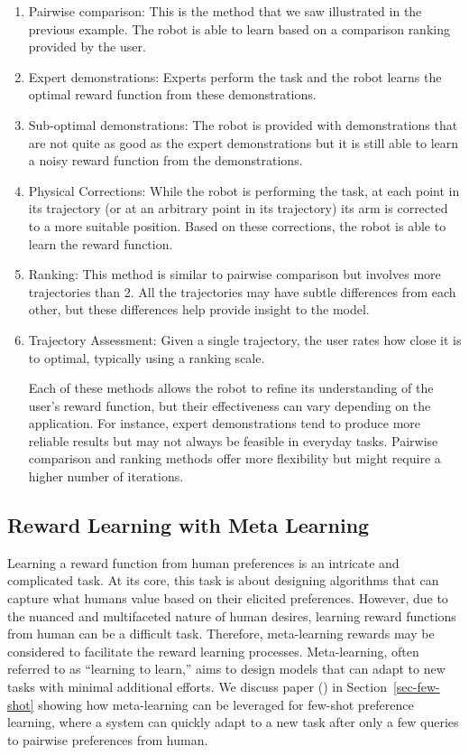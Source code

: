 \documentclass[
  letterpaper,
  numbers=noenddot,
  DIV=11,
  oneside]{scrreprt}
\theoremstyle{remark}
\begin{document}
\begin{enumerate}
\def\labelenumi{\arabic{enumi}.}
\item
  Pairwise comparison: This is the method that we saw illustrated in the
  previous example. The robot is able to learn based on a comparison
  ranking provided by the user.
\item
  Expert demonstrations: Experts perform the task and the robot learns
  the optimal reward function from these demonstrations.
\item
  Sub-optimal demonstrations: The robot is provided with demonstrations
  that are not quite as good as the expert demonstrations but it is
  still able to learn a noisy reward function from the demonstrations.
\item
  Physical Corrections: While the robot is performing the task, at each
  point in its trajectory (or at an arbitrary point in its trajectory)
  its arm is corrected to a more suitable position. Based on these
  corrections, the robot is able to learn the reward function.
\item
  Ranking: This method is similar to pairwise comparison but involves
  more trajectories than 2. All the trajectories may have subtle
  differences from each other, but these differences help provide
  insight to the model.
\item
  Trajectory Assessment: Given a single trajectory, the user rates how
  close it is to optimal, typically using a ranking scale.

  Each of these methods allows the robot to refine its understanding of
  the user's reward function, but their effectiveness can vary depending
  on the application. For instance, expert demonstrations tend to
  produce more reliable results but may not always be feasible in
  everyday tasks. Pairwise comparison and ranking methods offer more
  flexibility but might require a higher number of iterations.
\end{enumerate}

\subsection{Reward Learning with Meta
Learning}\label{reward-learning-with-meta-learning}

Learning a reward function from human preferences is an intricate and
complicated task. At its core, this task is about designing algorithms
that can capture what humans value based on their elicited preferences.
However, due to the nuanced and multifaceted nature of human desires,
learning reward functions from human can be a difficult task. Therefore,
meta-learning rewards may be considered to facilitate the reward
learning processes. Meta-learning, often referred to as ``learning to
learn,'' aims to design models that can adapt to new tasks with minimal
additional efforts. We discuss paper () in Section~\ref{sec-few-shot} showing how
meta-learning can be leveraged for few-shot preference learning, where a
system can quickly adapt to a new task after only a few queries to
pairwise preferences from human.
\end{document}
